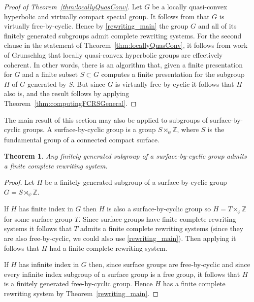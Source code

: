\documentclass[12pt, a4paper]{amsart}
\newtheorem{theorem}{Theorem}[section]
\theoremstyle{definition}
\newcommand{\Z}{\mathbb{Z}}
\begin{document}
\begin{proof}[Proof of Theorem~\ref{thm:locallyQuasConv}] 
Let $G$ be a locally quasi-convex hyperbolic and virtually compact special group. It follows from \cite[Theorem A.2]{fisher2026coherent} that $G$ is virtually free-by-cyclic. Hence by  \cref{rewriting_main} 
the group $G$ and all of its finitely generated subgroups admit complete rewriting systems.  
For the second clause in the statement of Theorem~\ref{thm:locallyQuasConv}, it follows from work of Grunschlag \cite[Proposition 6.1]{Grunschlag1999} that locally quasi-convex hyperbolic groups are effectively coherent. In other words, there is an algorithm that, given a finite presentation for $G$ and a finite subset $S\subset G$ computes a finite presentation for the subgroup $H$ of $G$ generated by $S$. But since $G$ is virtually free-by-cyclic it follows that $H$ also is, and the result follows by applying Theorem~\ref{thm:computingFCRSGeneral}. 
\end{proof}


The main result of this section may also be applied to subgroups of surface-by-cyclic groups. A surface-by-cyclic group is a group $S \rtimes_{\psi} \Z$, where $S$ is the fundamental group of a connected compact surface. 

\begin{theorem}\label{thm:SurfaceByCyclic} 
Any finitely generated subgroup of a surface-by-cyclic group admits a finite complete rewriting system. 
  \end{theorem}
\begin{proof} 
Let $H$ be a finitely generated subgroup of a surface-by-cyclic group $G = S \rtimes_{\psi} \mathbb{Z}$.

If $H$ has finite index in $G$ then $H$ is also a surface-by-cyclic group so $H = T \rtimes_{\phi} \mathbb{Z}$ for some surface group $T$. Since surface groups have finite complete rewriting systems \cite{LeChenadec1986} it follows that $T$ admits a finite complete rewriting systems (since they are also free-by-cyclic, we could also use \cref{rewriting_main}). Then applying \cite[Proof of part (1) of  Theorem (2)]{Groves1993} it follows that $H$ had a finite complete rewriting system. 

If $H$ has infinite index in $G$ then, since surface groups are free-by-cyclic and since every infinite index subgroup of a surface group is a free group, it follows that $H$ is a finitely generated free-by-cyclic group. Hence $H$ has a finite complete rewriting system by Theorem~\ref{rewriting_main}. \end{proof}
\end{document}
